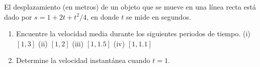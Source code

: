 \item El desplazamiento (en metros) de un objeto que se mueve en una línea recta está dado por $s = 1 + 2t + t^2/4$, en donde $t$ se mide en segundos.
    \begin{enumerate}
        \item Encuentre la velocidad media durante los siguientes periodos de tiempo.
        (i) $[1, 3]$ \quad (ii) $[1, 2]$ \quad (iii) $[1, 1.5]$ \quad (iv) $[1, 1.1]$
        \item Determine la velocidad instantánea cuando $t = 1$.
    \end{enumerate}

